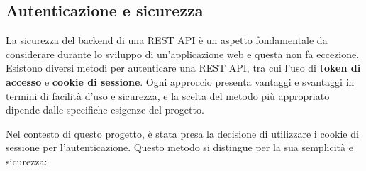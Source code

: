 \subsection{Autenticazione e sicurezza}
La sicurezza del backend di una REST API è un aspetto fondamentale da considerare durante lo sviluppo di un'applicazione web e questa non fa eccezione. Esistono diversi metodi per autenticare una REST API, tra cui l'uso di \textbf{token di accesso} e \textbf{cookie di sessione}. Ogni approccio presenta vantaggi e svantaggi in termini di facilità d'uso e sicurezza, e la scelta del metodo più appropriato dipende dalle specifiche esigenze del progetto.

Nel contesto di questo progetto, è stata presa la decisione di utilizzare i cookie di sessione per l'autenticazione. Questo metodo si distingue per la sua semplicità e sicurezza:
